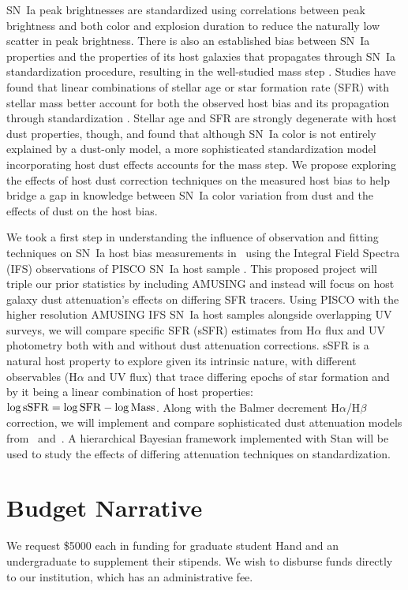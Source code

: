 \documentclass[modern]{aastex63}
\begin{document}
SN~Ia peak brightnesses are standardized using correlations between peak brightness and both color and explosion duration to reduce the naturally low scatter in peak brightness.
There is also an established bias between SN~Ia properties and the properties of its host galaxies that propagates through SN~Ia standardization procedure, resulting in the well-studied mass step \citep{Sullivan2010}. 
Studies have found that linear combinations of stellar age or star formation rate (SFR) with stellar mass better account for both the observed host bias and its propagation through standardization \citep{Rigault2018,Rose2021}.
Stellar age and SFR are strongly degenerate with host dust properties, though, and \cite{Brout2021} found that although SN~Ia color is not entirely explained by a dust-only model, a more sophisticated standardization model incorporating host dust effects accounts for the mass step.
We propose exploring the effects of host dust correction techniques on the measured host bias to help bridge a gap in knowledge between SN~Ia color variation from dust and the effects of dust on the host bias.

We took a first step in understanding the influence of observation and fitting techniques on SN~Ia host bias measurements in~\cite{Hand2021} using the Integral Field Spectra (IFS) observations of PISCO SN~Ia host sample \citep{Galbany2018}.  
This proposed project will triple our prior statistics by including AMUSING \citep{Galbany2016a} and instead will focus on host galaxy dust attenuation's effects on differing SFR tracers. 
Using PISCO with the higher resolution AMUSING IFS SN~Ia host samples alongside overlapping UV surveys, we will compare specific SFR (sSFR) estimates from H$\alpha$ flux and UV photometry both with and without dust attenuation corrections.
sSFR is a natural host property to explore given its intrinsic nature, with different observables (H$\alpha$ and UV flux) that trace differing epochs of star formation and by it being a linear combination of host properties: $\log{\rm sSFR} = \log{\rm SFR} - \log{\rm Mass}$.
Along with the Balmer decrement H$\alpha$/H$\beta$ correction, we will implement and compare sophisticated dust attenuation models from~\cite{Salim2018} and~\cite{Narayanan2018}.  
A hierarchical Bayesian framework implemented with Stan will be used to study the effects of differing attenuation techniques on standardization.

\section{Budget Narrative}
We request \$5000 each in funding for graduate student Hand and an undergraduate to supplement their stipends.  We wish to disburse funds directly to our institution, which has an administrative fee.



\end{document}
